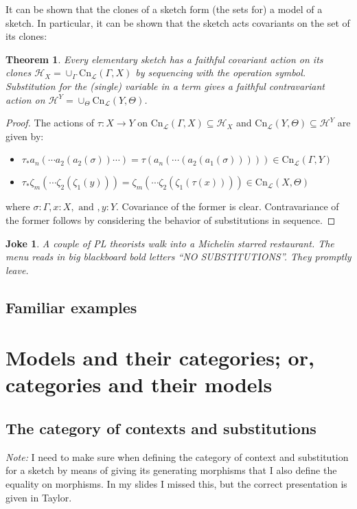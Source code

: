 \documentclass[12pt,twoside]{reedthesis}
\newtheorem{theorem}{Theorem}
\newtheorem{joke}{Joke}
\begin{document}
  It can be shown that the clones of a sketch form (the sets for) a model of a sketch. In particular, it can be shown that the sketch acts covariants on the set of its clones:
  \begin{theorem}
    Every elementary sketch has a faithful covariant action on its clones
    \(\mathcal{H}_{X} = \cup_{\Gamma} \text{Cn}_{\mathcal{L}}(\Gamma,X)\) by
    sequencing with the operation symbol. Substitution for the (single)
    variable in a term gives a faithful contravariant action on
    \(\mathcal{H}^{Y} = \cup_{\Theta} \text{Cn}_{\mathcal{L}}(Y,\Theta)\).
  \end{theorem}
  \begin{proof}
    The actions of \(\tau : X \rightarrow Y\) on \(\text{Cn}_\mathcal{L}(\Gamma,X) \subseteq \mathcal{H}_{X}\) and \(\text{Cn}_\mathcal{L}(Y,\Theta) \subseteq \mathcal{H}^{Y}\) are given by:
    \begin{itemize}
      \item \(\tau_{*}a_{n}(\cdots a_{2}(a_{2}(\sigma))\cdots) = \tau(a_{n}(\cdots(a_{2}(a_{1}(\sigma))))) \in \text{Cn}_{\mathcal{L}}(\Gamma,Y)\)
      \item \(\tau_{*}\zeta_{m}(\cdots \zeta_{2}(\zeta_{1}(y))) = \zeta_{m}(\cdots\zeta_{2}(\zeta_{1}(\tau(x)))) \in \text{Cn}_{\mathcal{L}}(X,\Theta)\)
    \end{itemize}
    where \(\sigma : \Gamma, x : X, \text { and }, y:Y\).
    Covariance of the former is clear. Contravariance of the former follows by considering the behavior of substitutions in sequence.
  \end{proof}

  \begin{joke}
    A couple of PL theorists walk into a Michelin starred restaurant. The menu
    reads in big blackboard bold letters ``NO SUBSTITUTIONS''. They promptly
    leave.
  \end{joke}



\subsection{Familiar examples}
\section{Models and their categories; or, categories and their models}
\subsection{The category of contexts and substitutions}
\emph{Note:} I need to make sure when defining the category of context and substitution for a sketch by means of giving its generating morphisms that I also define the equality on morphisms. In my slides I missed this, but the correct presentation is given in Taylor.
\end{document}
